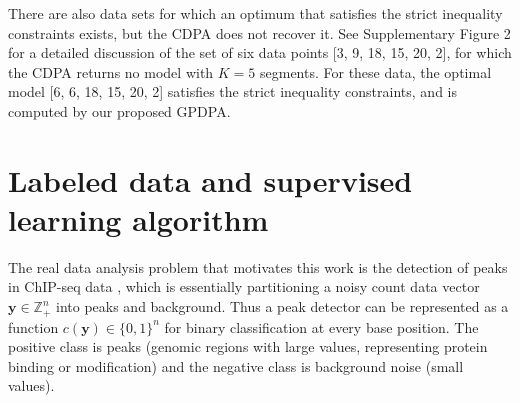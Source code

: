 \documentclass[twoside,11pt]{article}
\newcommand{\ZZ}{\mathbb Z}
\begin{document}
There are also data sets for which an optimum that satisfies the
strict inequality constraints exists, but the CDPA does not recover
it. See Supplementary Figure 2 for a detailed discussion of the 
set of six data points [3, 9, 18, 15, 20, 2], for which the CDPA returns no model with
$K=5$ segments. For these data, the optimal model [6, 6, 18, 15, 20,
2] satisfies the strict inequality constraints, and is computed by our
proposed GPDPA.

\section{Labeled data and supervised learning algorithm}
\label{sec:labeled-supervised}

The real data analysis problem that motivates this work is the
detection of peaks in ChIP-seq data \citep{practical},
which
is essentially partitioning a noisy count data vector $\mathbf y\in\ZZ_+^n$ into peaks and
background. Thus a peak detector can be represented as a function
$c(\mathbf y)\in\{0,1\}^n$ for binary classification at every base
position. The positive class is peaks (genomic regions with large
values, representing protein binding or modification) and the negative
class is background noise (small values).
\end{document}
